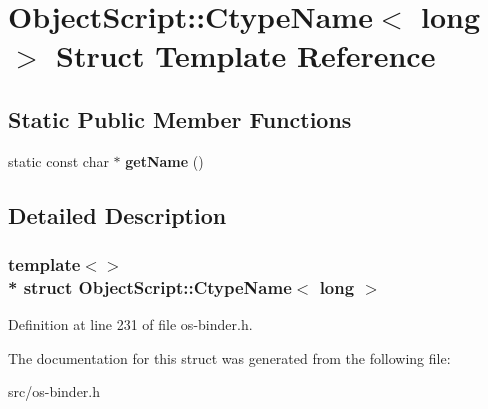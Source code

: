 \hypertarget{struct_object_script_1_1_ctype_name_3_01long_01_4}{}\section{Object\+Script\+:\+:Ctype\+Name$<$ long $>$ Struct Template Reference}
\label{struct_object_script_1_1_ctype_name_3_01long_01_4}
\subsection*{Static Public Member Functions}
\begin{DoxyCompactItemize}
\item 
static const char $\ast$ {\bfseries get\+Name} ()\hypertarget{struct_object_script_1_1_ctype_name_3_01long_01_4_a3a8a282bef476b72a80e4badda71830d}{}\label{struct_object_script_1_1_ctype_name_3_01long_01_4_a3a8a282bef476b72a80e4badda71830d}

\end{DoxyCompactItemize}


\subsection{Detailed Description}
\subsubsection*{template$<$$>$\\*
struct Object\+Script\+::\+Ctype\+Name$<$ long $>$}



Definition at line 231 of file os-\/binder.\+h.



The documentation for this struct was generated from the following file\+:\begin{DoxyCompactItemize}
\item 
src/os-\/binder.\+h\end{DoxyCompactItemize}
